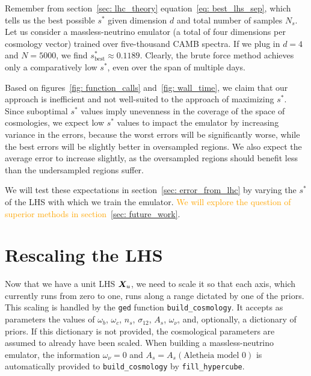 Remember from section~\ref{sec: lhc_theory} equation~\ref{eq: best_lhs_sep},
which tells us the best possible $s^*$
given dimension $d$ and total number of samples $N_s$. Let us consider a 
massless-neutrino emulator (a total of four dimensions per cosmology vector)
trained over five-thousand CAMB spectra. If we plug in $d = 4$ and $N=5000$,
we find $s^*_\text{best} \approx 0.1189$. Clearly, the brute force method
achieves only a comparatively low $s^*$, even over the span of multiple days.

Based on figures~\ref{fig: function_calls} and~\ref{fig: wall_time}, we
claim that our approach is inefficient and not well-suited to the approach of 
maximizing $s^*$. Since suboptimal $s^*$ values imply unevenness in the
coverage of the space of cosmologies, we expect low $s^*$ values to impact
the emulator by increasing variance in the errors, because the worst errors
will be significantly worse, while the best errors will be slightly better in
oversampled regions. We also expect the average error to increase slightly,
as the oversampled regions should benefit less than the undersampled regions
suffer.


We will test these expectations in section~\ref{sec: error_from_lhc} by
varying the $s^*$ of the LHS with which we train the emulator.
\textcolor{orange}{We will explore the question of superior methods in
section~\ref{sec: future_work}}.

\section{Rescaling the LHS}
\label{sec: lhc_rescale}


Now that we have a unit LHS $\bm{X}_u$, we need to scale it 
so that each axis, which currently runs from zero to one, runs along a range 
dictated by one of the priors. This scaling is handled by the \texttt{ged}
function \verb|build_cosmology|. It accepts as parameters the values of
$\omega_b$, $\omega_c$, $n_s$, $\sigma_{12}$, $A_s$, $\omega_\nu$, and, 
optionally, a dictionary of priors. If this
dictionary is not provided, the cosmological parameters are assumed to
already have been scaled. When building a massless-neutrino emulator,
the information $\omega_\nu = 0$ and $A_s = A_s(\text{Aletheia model 0})$ is
automatically provided to \verb|build_cosmology| by
\verb|fill_hypercube|. 

